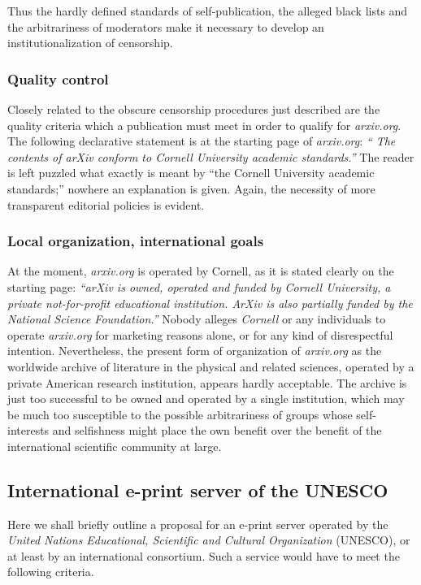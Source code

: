 Thus the hardly defined standards of self-publication, the alleged black
lists and the arbitrariness of moderators make it necessary to develop
an institutionalization of censorship.


\subsubsection{Quality control}

Closely related to the  obscure censorship procedures just described are
the quality criteria which a publication must meet in order to qualify for {\it
arxiv.org}.  The following declarative statement is at the starting page
of {\it arxiv.org}:  {\em `` The contents of arXiv conform to Cornell
University academic standards.''} The reader is left puzzled what
exactly is meant by ``the Cornell University academic standards;''
nowhere an explanation is given.  Again, the necessity of more
transparent editorial policies is evident.


\subsubsection{Local organization, international goals}

At the moment,
{\it arxiv.org} is operated by Cornell, as it is stated clearly on the
starting page:  {\em ``arXiv is owned, operated and funded by Cornell
University, a private not-for-profit educational institution.  ArXiv is
also partially funded by the National Science Foundation.''} Nobody
alleges {\it Cornell} or any individuals to operate {\it arxiv.org} for
marketing reasons alone, or for any kind of disrespectful intention.  Nevertheless,
the present form of organization of {\it
arxiv.org} as the worldwide archive of literature in the physical and
related sciences, operated by a private American research institution,
appears hardly acceptable.  The archive is just too successful to be
owned and operated by a single institution, which may be much too
susceptible to the possible arbitrariness of
groups  whose self-interests and selfishness might place the own benefit
over the benefit of the international scientific community at large.


\subsection{International e-print server of the UNESCO}

Here we shall briefly outline a proposal for an e-print server operated
by the {\it United Nations Educational, Scientific and Cultural
Organization} (UNESCO), or at least by an international consortium.
Such a service would have to meet the following criteria.


